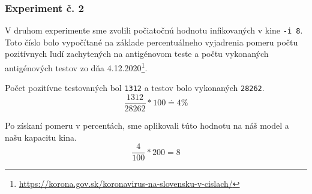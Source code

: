 \documentclass[a4paper, 11pt]{article}
\begin{document}
        \par
        
        \subsubsection{Experiment č. 2}
        \label{sec:ex.2}
            V druhom experimente sme zvolili počiatočnú hodnotu infikovaných v kine \texttt{-i 8}. Toto číslo bolo vypočítané na základe percentuálneho vyjadrenia pomeru počtu pozitívnych ľudí zachytených na antigénovom teste a počtu vykonaných antigénových testov zo dňa 4.12.2020\footnote{\href{https://korona.gov.sk/koronavirus-na-slovensku-v-cislach/}{https://korona.gov.sk/koronavirus-na-slovensku-v-cislach/}}.
            
            \par Počet pozitívne testovaných bol \texttt{1312} a testov bolo vykonaných \texttt{28262}.
            $$ \frac{1312}{28262} * 100 \doteq 4\% $$
            
            \par Po získaní pomeru v percentách, sme aplikovali túto hodnotu na náš model a našu kapacitu kina.
            $$ \frac{4}{100} * 200 = 8 $$
            
            \begin{table}[h]
        \end{table}
        
\end{document}
